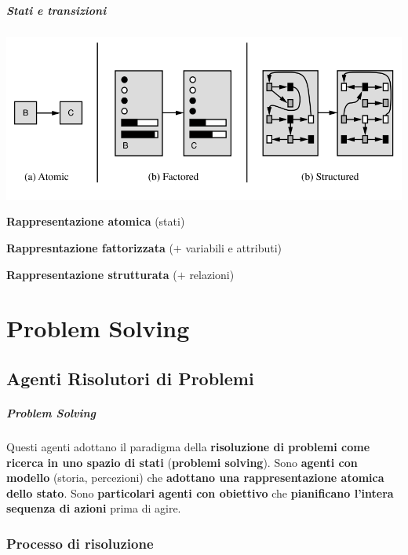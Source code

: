 \documentclass[10pt]{book}
\begin{document}
\paragraph{Stati e transizioni}
\begin{center}
	\includegraphics[scale=0.75]{rapprstatitransizioni.png}
\end{center}
\begin{list}{}{}
	\item \textbf{Rappresentazione atomica} (stati)
	\item \textbf{Rappresntazione fattorizzata} ($+$ variabili e attributi)
	\item \textbf{Rappresentazione strutturata} ($+$ relazioni)
\end{list}

\chapter{Problem Solving}
\section{Agenti Risolutori di Problemi}
\paragraph{Problem Solving} Questi agenti adottano il paradigma della \textbf{risoluzione di problemi come ricerca in uno spazio di stati} (\textbf{problemi solving}). Sono \textbf{agenti con modello} (storia, percezioni) che \textbf{adottano una rappresentazione atomica dello stato}. Sono \textbf{particolari agenti con obiettivo} che \textbf{pianificano l'intera sequenza di azioni} prima di agire.
\subsection{Processo di risoluzione}
\end{document}
